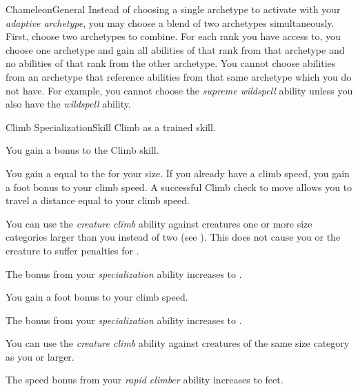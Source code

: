 \begin{feat}{Chameleon}{General}
         Instead of choosing a single archetype to activate with your \textit{adaptive archetype}, you may choose a blend of two archetypes simultaneously.
        First, choose two archetypes to combine.
        For each rank you have access to, you choose one archetype and gain all abilities of that rank from that archetype and no abilities of that rank from the other archetype.
        You cannot choose abilities from an archetype that reference abilities from that same archetype which you do not have.
        For example, you cannot choose the \textit{supreme wildspell} ability unless you also have the \textit{wildspell} ability.
    \end{feat}

    \begin{feat}{Climb Specialization}{Skill}
        \featpre Climb as a trained skill.

         You gain a  bonus to the Climb skill.

         You gain a  equal to the  for your size.
        If you already have a climb speed, you gain a  foot bonus to your climb speed.
        A successful Climb check to move allows you to travel a distance equal to your climb speed.

         You can use the \textit{creature climb} ability against creatures one or more size categories larger than you instead of two (see ).
        This does not cause you or the creature to suffer penalties for \squeezing.

         The bonus from your \textit{specialization} ability increases to .

         You gain a  foot bonus to your climb speed.

         The bonus from your \textit{specialization} ability increases to .

         You can use the \textit{creature climb} ability against creatures of the same size category as you or larger.

         The speed bonus from your \textit{rapid climber} ability increases to  feet.
    \end{feat}


